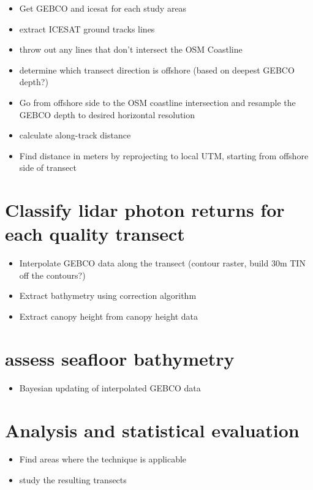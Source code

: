 \begin{itemize}

      \item Get GEBCO and icesat for each study areas
      \item extract ICESAT ground tracks lines
      \item throw out any lines that don't intersect the OSM Coastline
      \item determine which transect direction is offshore (based on deepest GEBCO depth?)
      \item Go from offshore side to the OSM coastline intersection and resample the GEBCO depth to desired horizontal resolution
      \item calculate along-track distance
      \item Find distance in meters by reprojecting to local UTM, starting from offshore side of transect
\end{itemize}

\section{Classify lidar photon returns for each quality  transect}

\begin{itemize}

      \item Interpolate GEBCO data along the transect (contour raster, build 30m TIN off the contours?)
      \item Extract bathymetry using correction algorithm
      \item Extract canopy height from canopy height data
\end{itemize}


\section{assess seafloor bathymetry}

\begin{itemize}
      \item Bayesian updating of interpolated GEBCO data
\end{itemize}

\section{Analysis and statistical evaluation}

\begin{itemize}
      \item Find areas where the technique is applicable
      \item study the resulting transects
\end{itemize}


